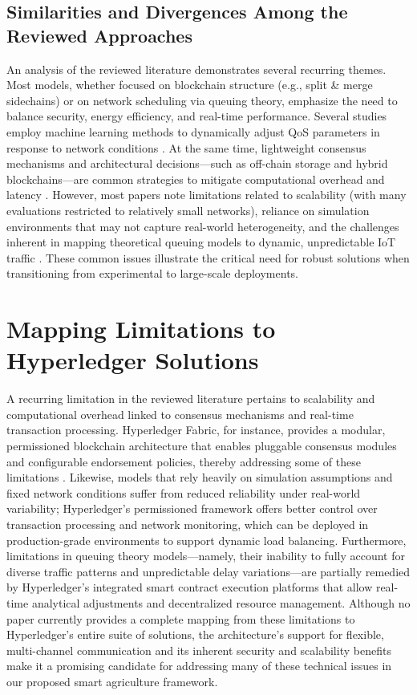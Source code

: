 \documentclass[12pt,onecolumn]{IEEEtran} %
\begin{document}
\subsection*{Similarities and Divergences Among the Reviewed Approaches}
An analysis of the reviewed literature demonstrates several recurring themes. Most models, whether focused on blockchain structure (e.g., split \& merge sidechains) or on network scheduling via queuing theory, emphasize the need to balance security, energy efficiency, and real-time performance. Several studies employ machine learning methods to dynamically adjust QoS parameters in response to network conditions \cite{agrawal2022mlsmbqsdesignof,zhang2024ondemandcentralizedresource}. At the same time, lightweight consensus mechanisms and architectural decisions---such as off-chain storage and hybrid blockchains---are common strategies to mitigate computational overhead and latency \cite{haque2024ascalableblockchain}. However, most papers note limitations related to scalability (with many evaluations restricted to relatively small networks), reliance on simulation environments that may not capture real-world heterogeneity, and the challenges inherent in mapping theoretical queuing models to dynamic, unpredictable IoT traffic \cite{habeeb2022dynamicbandwidthslicing,zhang2024ondemandcentralizedresource}. These common issues illustrate the critical need for robust solutions when transitioning from experimental to large-scale deployments.

\section*{Mapping Limitations to Hyperledger Solutions}
A recurring limitation in the reviewed literature pertains to scalability and computational overhead linked to consensus mechanisms and real-time transaction processing. Hyperledger Fabric, for instance, provides a modular, permissioned blockchain architecture that enables pluggable consensus modules and configurable endorsement policies, thereby addressing some of these limitations \cite{pajooh2022experimentalperformanceanalysis}. Likewise, models that rely heavily on simulation assumptions and fixed network conditions suffer from reduced reliability under real-world variability; Hyperledger's permissioned framework offers better control over transaction processing and network monitoring, which can be deployed in production-grade environments to support dynamic load balancing. Furthermore, limitations in queuing theory models---namely, their inability to fully account for diverse traffic patterns and unpredictable delay variations---are partially remedied by Hyperledger's integrated smart contract execution platforms that allow real-time analytical adjustments and decentralized resource management. Although no paper currently provides a complete mapping from these limitations to Hyperledger's entire suite of solutions, the architecture's support for flexible, multi-channel communication and its inherent security and scalability benefits make it a promising candidate for addressing many of these technical issues in our proposed smart agriculture framework.
\end{document}
